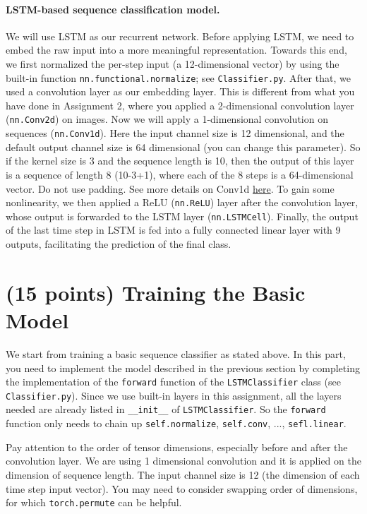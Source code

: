 \documentclass[11pt]{report}
\begin{document}
\paragraph{LSTM-based sequence classification model.}
\label{sec:LSTM}

We will use LSTM as our recurrent network. 
Before applying LSTM, 
we need to embed the raw input into a more meaningful representation. 
Towards this end, 
we first normalized the per-step input (a 12-dimensional vector) by using the built-in function \texttt{nn.functional.normalize}; 
see \texttt{Classifier.py}. 
After that, we used a convolution layer as our embedding layer. 
This is different from what you have done in Assignment 2, 
where you applied a 2-dimensional convolution layer (\texttt{nn.Conv2d}) on images.
Now we will apply a 1-dimensional convolution on sequences (\texttt{nn.Conv1d}). 
Here the input channel size is 12 dimensional,
and the default output channel size is 64 dimensional (you can change this parameter).
So if the kernel size is 3 and the sequence length is 10,
then the output of this layer is a sequence of length 8 (10-3+1),
where each of the 8 steps is a 64-dimensional vector.
Do not use padding.
See more details on Conv1d \href{https://pytorch.org/docs/stable/nn.html}{here}.
To gain some nonlinearity, we then applied a ReLU (\texttt{nn.ReLU}) layer after the convolution layer, 
whose output is forwarded to the LSTM layer (\texttt{nn.LSTMCell}). 
Finally, the output of the last time step in LSTM is fed into a fully connected linear layer with 9 outputs,
facilitating the prediction of the final class.




\section{(15 points) Training the Basic Model}
\label{sec:basic}

We start from training a basic sequence classifier as stated above. 
In this part, you need to implement the model described in the previous section by completing the implementation of the \texttt{forward} function of the \texttt{LSTMClassifier} class 
(see \texttt{Classifier.py}). 
Since we use built-in layers in this assignment, 
all the layers needed are already listed in \texttt{\_\_init\_\_} of \texttt{LSTMClassifier}. 
So the \texttt{forward} function only needs to chain up
\texttt{self.normalize}, \texttt{self.conv}, ..., \texttt{sefl.linear}.


Pay attention to the order of tensor dimensions, especially before and after the convolution layer. 
We are using 1 dimensional convolution and it is applied on the dimension of sequence length. 
The input channel size is 12 (the dimension of each time step input vector). 
You may need to consider swapping order of dimensions, 
for which \texttt{torch.permute} can be helpful. 
\end{document}
